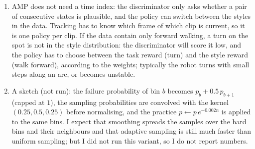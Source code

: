 \begin{enumerate}[label=\textbf{\ansnum.\arabic*}]
  \item AMP does not need a time index: the discriminator only asks whether a pair of consecutive states is plausible, and the policy can switch between the styles in the data. Tracking has to know which frame of which clip is current, so it is one policy per clip. If the data contain only forward walking, a turn on the spot is not in the style distribution: the discriminator will score it low, and the policy has to choose between the task reward (turn) and the style reward (walk forward), according to the weights; typically the robot turns with small steps along an arc, or becomes unstable.
  \item A sketch (not run): the failure probability of bin $b$ becomes $p_b+0.5\,p_{b+1}$ (capped at $1$), the sampling probabilities are convolved with the kernel $(0.25,0.5,0.25)$ before normalising, and the practice $p\leftarrow p\,e^{-0.002n}$ is applied to the same bins. I expect that smoothing spreads the samples over the hard bins and their neighbours and that adaptive sampling is still much faster than uniform sampling; but I did not run this variant, so I do not report numbers.
\end{enumerate}
